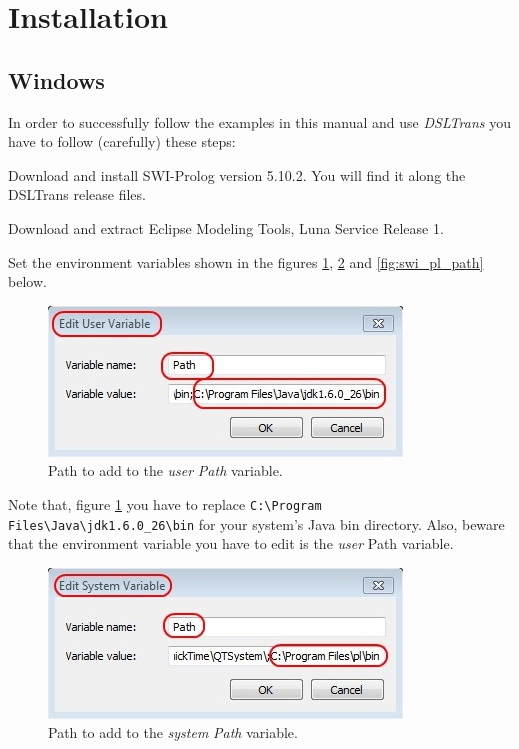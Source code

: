 ﻿\section{Installation}
\label{sec:installation}

\subsection{Windows}

In order to successfully follow the examples in this manual and use
\emph{DSLTrans} you have to follow (carefully) these steps:

Download and install SWI-Prolog version 5.10.2. You will find it along the DSLTrans release files.

Download and extract Eclipse Modeling Tools, Luna Service Release 1.

Set the environment variables shown in the figures \ref{fig:path_user}, \ref{fig:path_system} and \ref{fig:swi_pl_path} below.

\begin{figure}[h]
\begin{center}
  \includegraphics[scale=0.9]{imgs/path_user.jpg}
  \caption{Path to add to the \emph{user} \emph{Path} variable.}
  \label{fig:path_user}
\end{center}
\end{figure}

Note that, figure \ref{fig:path_user} you have to replace \verb=C:\Program Files\Java\jdk1.6.0_26\bin=
for your system's Java bin directory. Also, beware that the environment
variable you have to edit is the \emph{user} Path variable.

\begin{figure}[h]
\begin{center}
  \includegraphics[scale=0.9]{imgs/path_system.jpg}
  \caption{Path to add to the \emph{system} \emph{Path} variable.}
  \label{fig:path_system}
\end{center}
\end{figure}

